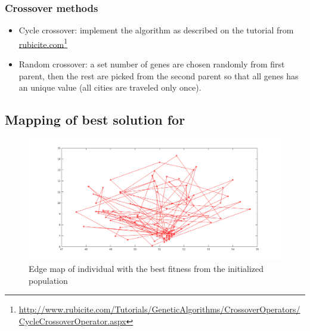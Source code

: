 \documentclass[14pt,a4paper,openright,twoside]{extreport}
\newcommand\fnurl[2]{%
    \href{#2}{#1}\footnote{\url{#2}}%
}
\begin{document}
\subsubsection*{Crossover methods}
\begin{itemize}
    \item Cycle crossover: implement the algorithm as described on the tutorial from \fnurl{rubicite.com}{http://www.rubicite.com/Tutorials/GeneticAlgorithms/CrossoverOperators/CycleCrossoverOperator.aspx}
    \item Random crossover: a set number of genes are chosen randomly from first parent, then the rest are picked from the second parent so that all genes has an unique value (all cities are traveled only once).
\end{itemize}


\subsection*{\textbf{Mapping of best solution for }}
\begin{figure}[H]
\begin{center}
\includegraphics[width=\textwidth]{tspmap_randomcross_neighbormutate_800_before.png}
\caption{\small{Edge map of individual with the best fitness from the initialized population}}
\label{genesis}
\end{center}
\end{figure}
\end{document}

